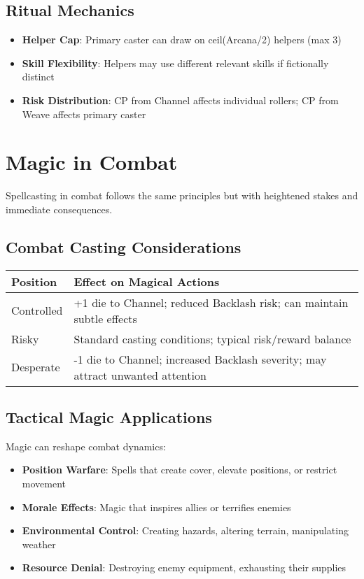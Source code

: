 \subsection*{Ritual Mechanics}

\begin{itemize}
    \item \textbf{Helper Cap}: Primary caster can draw on ceil(Arcana/2) helpers (max 3)
    \item \textbf{Skill Flexibility}: Helpers may use different relevant skills if fictionally distinct
    \item \textbf{Risk Distribution}: CP from Channel affects individual rollers; CP from Weave affects primary caster
\end{itemize}

\section*{Magic in Combat}

Spellcasting in combat follows the same principles but with heightened stakes and immediate consequences.

\subsection*{Combat Casting Considerations}

\begin{fatebox}
\begin{tabularx}{\textwidth}{lX}
\toprule
\textbf{Position} & \textbf{Effect on Magical Actions} \\
\midrule
Controlled & +1 die to Channel; reduced Backlash risk; can maintain subtle effects \\
Risky & Standard casting conditions; typical risk/reward balance \\
Desperate & -1 die to Channel; increased Backlash severity; may attract unwanted attention \\
\bottomrule
\end{tabularx}
\end{fatebox}

\subsection*{Tactical Magic Applications}

Magic can reshape combat dynamics:
\begin{itemize}
    \item \textbf{Position Warfare}: Spells that create cover, elevate positions, or restrict movement
    \item \textbf{Morale Effects}: Magic that inspires allies or terrifies enemies
    \item \textbf{Environmental Control}: Creating hazards, altering terrain, manipulating weather
    \item \textbf{Resource Denial}: Destroying enemy equipment, exhausting their supplies
\end{itemize}

